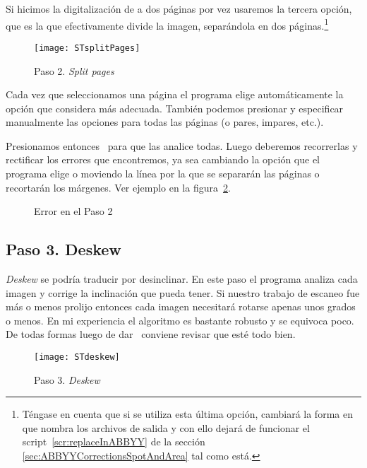 \documentclass[%
	a5paper,
	10pt,
	twoside,
	openright,
	final,
]{memoir}
\begin{document}
{	Si hicimos la digitalización de a dos páginas por vez usaremos la tercera opción, que es la que efectivamente divide la imagen, separándola en dos páginas.\footnote{Téngase en cuenta que si se utiliza esta última opción, cambiará la forma en que \scantailor nombra los archivos de salida y con ello dejará de funcionar el script~\ref{scr:replaceInABBYY} de la sección \ref{sec:ABBYYCorrectionsSpotAndArea} tal como está.}

	\begin{figure}
		\centering
		\texttt{[image: STsplitPages]}
		\caption{Paso 2. \emph{Split pages}\label{fig:STsplitPages}}
	\end{figure}

	Cada vez que seleccionamos una página el programa elige automáticamente la opción que considera más adecuada. También podemos presionar  y especificar manualmente las opciones para todas las páginas (o pares, impares, etc.).

	Presionamos entonces \play\ para que las analice todas. Luego deberemos recorrerlas y rectificar los errores que encontremos, ya sea cambiando la opción que el programa elige o moviendo la línea por la que se separarán las páginas o recortarán los márgenes. Ver ejemplo en la figura~\ref{fig:STsplitPagesError}.

	\begin{figure}
		\centering
		\hfill
		\caption{Error en el Paso 2\label{fig:STsplitPagesError}}
	\end{figure}

	\subsection{Paso 3. Deskew\label{sec:STdeskew}} \emph{Deskew} se podría traducir por desinclinar. En este paso el programa analiza cada imagen y corrige la inclinación que pueda tener. Si nuestro trabajo de escaneo fue más o menos prolijo entonces cada imagen necesitará rotarse apenas unos grados o menos. En mi experiencia el algoritmo es bastante robusto y se equivoca poco. De todas formas luego de dar \play\ conviene revisar que esté todo bien.

	\begin{figure}
		\centering
		\texttt{[image: STdeskew]}
		\caption{Paso 3. \emph{Deskew}\label{fig:STdeskew}}
	\end{figure}

}
\end{document}
